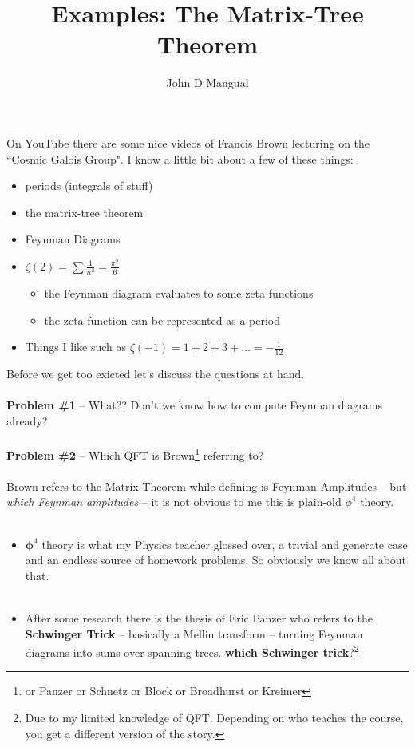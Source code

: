 \documentclass[12pt]{article}
\title{\textbf{ Examples: The Matrix-Tree Theorem}}
\author{John D Mangual}
\date{}
\begin{document}
\selectfont \fontsize{25}{30}\selectfont

\maketitle

\selectfont \fontsize{12}{10}\selectfont

\noindent On YouTube there are some nice videos of Francis Brown lecturing on the ``Cosmic Galois Group".  I know a little bit about a few of these things:
\begin{itemize}
\item periods (integrals of stuff)
\item the matrix-tree theorem
\item Feynman Diagrams
\item $\zeta(2) = \sum \frac{1}{n^2} = \frac{\pi^2}{6}$ 
\begin{itemize}
\item the Feynman diagram evaluates to some zeta functions
\item the zeta function can be represented as a period
\end{itemize}
\item Things I like such as $\zeta(-1) = 1 + 2 + 3 + \dots = - \frac{1}{12}$
\end{itemize}
Before we get too exicted let's discuss the questions at hand. \\ \\
\textbf{Problem \#1} -- What?? Don't we know how to compute Feynman diagrams already? \\ \\
\textbf{Problem \#2} -- Which QFT is Brown\footnote{ or Panzer or Schnetz or Block or Broadhurst or Kreimer} referring to? \\ \\
Brown refers to the Matrix Theorem while defining is Feynman Amplitudes -- but \textit{which Feynman amplitudes} -- it is not obvious to me this is plain-old $\phi^4$ theory. \\ \\
\begin{itemize}
\item $\mathbf{\phi}^4$ theory is what my Physics teacher glossed over, a trivial and generate case and an endless source of homework problems.  So obviously we know all about that. \\ \\
\item After some research there is the thesis of Eric Panzer who refers to the \textbf{Schwinger Trick} -- basically a Mellin transform -- turning Feynman diagrams into sums over spanning trees.  \textbf{\color{green!80!black!80!white} which Schwinger trick}?\;\footnote{Due to my limited knowledge of QFT.  Depending on who teaches the course, you get a different version of the story.}
\end{itemize}
\end{document}
